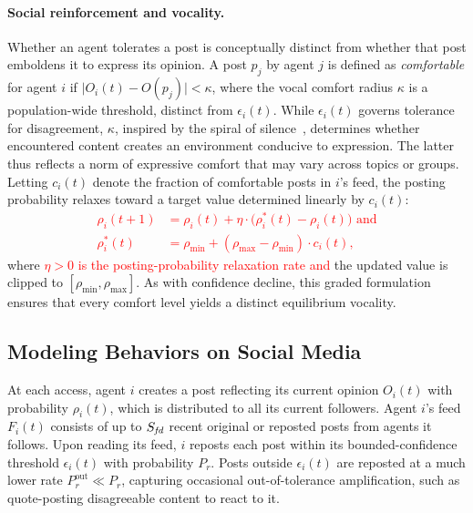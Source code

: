 \documentclass{svproc}
\def\red#1{\textcolor{red}{#1}}
\def\post{\rho}                 %
\def\BoundedConfidence{\epsilon} %
\def\feed{F}                    %
\def\maxfeed{S_{\it fd}}         %
\def\VCR{\kappa}                 %
\begin{document}
\paragraph{Social reinforcement and vocality.} 
Whether an agent tolerates a post is conceptually distinct from
whether that post emboldens it to express its opinion. A post $p_j$ by
agent $j$ is defined as \emph{comfortable} for agent $i$ if
$\vert O_i(t)-O(p_j)\vert <\VCR$, where the vocal comfort radius
$\VCR$ is a population-wide threshold, distinct from
$\BoundedConfidence_i(t)$. While $\BoundedConfidence_i(t)$ governs
tolerance for disagreement, $\VCR$, inspired by the spiral of
silence~\cite{noelle-neumann1974}, determines whether encountered
content creates an environment conducive to expression. The latter
thus reflects a norm of expressive comfort that may vary across topics
or groups. Letting $c_i(t)$ denote the fraction of comfortable posts
in $i$'s feed, the posting probability relaxes toward a target value
determined linearly by $c_i(t)$:
%
\red{
\begin{equation}\label{eq:social-reinforcement}
  \begin{aligned}
    \post_i(t{+}1) &=
    \post_i(t) + \eta\cdot\big(\post_i^{\ast}(t)-\post_i(t)\big) \text{ and}\\
        \post_i^{\ast}(t) &=
    \post_{\min} + (\post_{\max}-\post_{\min})\cdot c_i(t),
  \end{aligned}
\end{equation}
}
%
where \red{$\eta>0$ is the posting-probability relaxation rate and} the
updated value is clipped to $[\post_{\min},\post_{\max}]$. As with
confidence decline, this graded 
formulation ensures that every comfort level yields a distinct
equilibrium vocality.
\par


\subsection{Modeling Behaviors on Social Media}\label{sec:model-behaviors}
At each access, agent $i$ creates a post reflecting its current
opinion $O_i(t)$ with probability $\post_i(t)$, which is distributed
to all its current followers. Agent $i$'s feed $\feed_i(t)$ consists
of up to $\maxfeed$ recent original or reposted posts from agents it
follows. Upon reading its feed, $i$ reposts each post within its
bounded-confidence threshold $\BoundedConfidence_i(t)$ with
probability $P_r$. Posts outside $\BoundedConfidence_i(t)$ are
reposted at a much lower rate $P_r^{\text{out}}\ll P_r$, capturing
occasional out-of-tolerance amplification, such as quote-posting
disagreeable content to react to it.
\par
\end{document}

